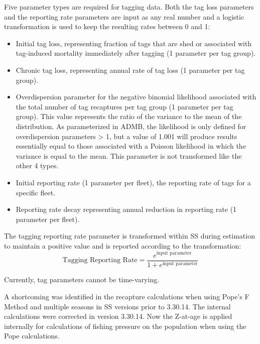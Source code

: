 Five parameter types are required for tagging data. Both the tag loss parameters and the reporting rate parameters are input as any real number and a logistic transformation is used to keep the resulting rates between 0 and 1:
\begin{itemize}
	\item Initial tag loss, representing fraction of tags that are shed or associated with tag-induced mortality immediately after tagging (1 parameter per tag group). 
	\item Chronic tag loss, representing annual rate of tag loss (1 parameter per tag group).
	\item Overdispersion parameter for the negative binomial likelihood associated with the total number of tag recaptures per tag group (1 parameter per tag group). This value represents the ratio of the variance to the mean of the distribution. As parameterized in ADMB, the likelihood is only defined for overdispersion parameters > 1, but a value of 1.001 will produce results essentially equal to those associated with a Poisson likelihood in which the variance is equal to the mean. This parameter is not transformed like the other 4 types.
	\item Initial reporting rate (1 parameter per fleet), the reporting rate of tags for a specific fleet.
	\item Reporting rate decay representing annual reduction in reporting rate (1 parameter per fleet).
\end{itemize}

The tagging reporting rate parameter is transformed within SS during estimation to maintain a positive value and is reported according to the transformation:
\begin{equation}
	\text{Tagging Reporting Rate} = \frac{e^{\text{input parameter}}}{1+e^{\text{input parameter}}}
\end{equation}

Currently, tag parameters cannot be time-varying.

A shortcoming was identified in the recapture calculations when using Pope's F Method and multiple seasons in SS versions prior to 3.30.14. The internal calculations were corrected in version 3.30.14. Now the Z-at-age is applied internally for calculations of fishing pressure on the population when using the Pope calculations.

